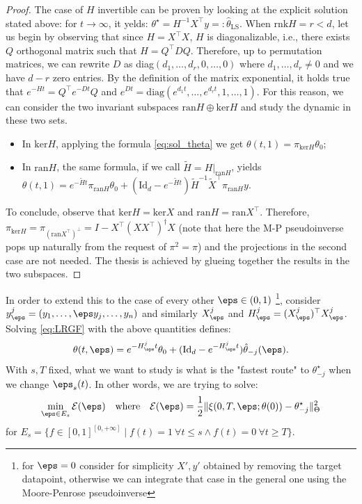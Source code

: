 \begin{proof}
  The case of $H$ invertible can be proven by looking at the explicit solution stated above: for $t\to\infty$, it yelds: $\theta^\star=H^{-1}X^\top y=:\hat\theta_{\mathrm{LS}}$.
  When $\mathrm{rnk} H=r<d$, let us begin by observing that since $H=X^\top X$, $H$ is diagonalizable, i.e., there exists $Q$ orthogonal matrix such that $H=Q^\top D Q$.
  Therefore, up to permutation matrices, we can rewrite $D$ as diag$(d_1,\dots,d_r,0,\dots,0)$ where $d_1,\dots,d_r\neq0$ and we have $d-r$ zero entries.
  By the definition of the matrix exponential, it holds true that $e^{-Ht}=Q^\top e^{-Dt} Q$ and $e^{Dt}=\mathrm{diag}(e^{d_1 t},\dots,e^{d_r t},1,\dots,1)$.
  For this reason, we can consider the two invariant subspaces $\mathrm{ran}H\oplus\mathrm{ker}H$ and study the dynamic in these two sets.
  \begin{itemize}
    \item In $\mathrm{ker}H$, applying the formula \ref{eq:sol_theta} we get $\theta(t,1)=\pi_{\mathrm{ker}H}\theta_0$;
    \item In $\mathrm{ran}H$, the same formula, if we call $\tilde H=H\vert_{\mathrm{ran}H}$, yields $\theta(t,1)=e^{-\tilde H t} \pi_{\mathrm{ran}H}\theta_0 +(\mathrm{Id}_d-e^{-\tilde H t})\tilde H^{-1}\tilde X^\top \pi_{\mathrm{ran}H}y$.
  \end{itemize}
  To conclude, observe that $\mathrm{ker}H=\mathrm{ker}X$ and $\mathrm{ran}H=\mathrm{ran}X^\top$.
  Therefore, $\pi_{\mathrm{ker}H} = \pi_{(\mathrm{ran}X^\top)^\bot} = I-X^\top (X X^\top)^\dagger X$ (note that here the M-P pseudoinverse pops up naturally from the request of $\pi^2=\pi$) and the projections in the second case are not needed.
  The thesis is achieved by glueing together the results in the two subspaces.
\end{proof}

In order to extend this to the case of every other $\eps\in(0,1)$ 
\footnote{for $\eps=0$ consider for simplicity $X',y'$ obtained by removing the target datapoint, otherwise we can integrate that case in the general one using the Moore-Penrose pseudoinverse}, 
consider \\$y^j_\eps = (y_1,\dots,\eps y_j,\dots,y_n)$ and similarly $X^j_\eps$ and $H^j_\eps=(X^j_\eps)^\top X^j_\eps$.
Solving \eqref{eq:LRGF} with the above quantities defines:
\begin{equation}\label{eq:eq2}
  \theta(t,\eps)= e^{-H^j_\eps t} \theta_0 +(\mathrm{Id}_d-e^{-H^j_\eps t})\hat\theta_{-j}(\eps) .
\end{equation}
With $s,T$ fixed, what we want to study is what is the "fastest route" to $\theta^\star_{-j}$ when we change $\eps_s(t)$.
In other words, we are trying to solve:
\begin{equation}\label{eq:obs_meas}
  \min_{\eps\in E_s}\mathcal{E}(\eps)\quad \text{where}\quad \mathcal{E}(\eps)=\frac12\|\xi(0,T,\eps;\theta(0))-\theta^\star_{-j}\|_\Theta^2
\end{equation}
for $E_s=\{f\in[0,1]^{[0,+\infty]} \mid f(t)=1~\forall t\leq s \wedge f(t)=0 ~\forall t\geq T\}$.

